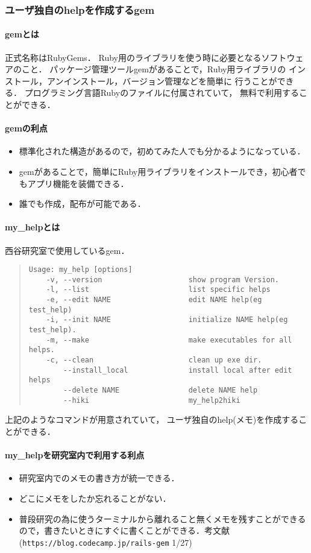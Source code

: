 \subsubsection{ユーザ独自のhelpを作成するgem}
\paragraph{gemとは}
正式名称はRubyGems．
Ruby用のライブラリを使う時に必要となるソフトウェアのこと．
パッケージ管理ツールgemがあることで，Ruby用ライブラリの
インストール，アンインストール，バージョン管理などを簡単に
行うことができる．
プログラミング言語Rubyのファイルに付属されていて，
無料で利用することができる．

\paragraph{gemの利点}
\begin{itemize}
\item 標準化された構造があるので，初めてみた人でも分かるようになっている．
\item gemがあることで，簡単にRuby用ライブラリをインストールでき，初心者でもアプリ機能を装備できる．
\item 誰でも作成，配布が可能である．
\end{itemize}
\paragraph{my\_helpとは}
西谷研究室で使用しているgem．
\begin{quote}\begin{verbatim}
Usage: my_help [options]
    -v, --version                    show program Version.
    -l, --list                       list specific helps
    -e, --edit NAME                  edit NAME help(eg test_help)
    -i, --init NAME                  initialize NAME help(eg test_help).
    -m, --make                       make executables for all helps.
    -c, --clean                      clean up exe dir.
        --install_local              install local after edit helps
        --delete NAME                delete NAME help
        --hiki                       my_help2hiki
\end{verbatim}\end{quote}
上記のようなコマンドが用意されていて，
ユーザ独自のhelp(メモ)を作成することができる．

\paragraph{my\_helpを研究室内で利用する利点}
\begin{itemize}
\item 研究室内でのメモの書き方が統一できる．
\item どこにメモをしたか忘れることがない．
\item 普段研究の為に使うターミナルから離れること無くメモを残すことができるので，書きたいときにすぐに書くことができる．考文献(\verb|https://blog.codecamp.jp/rails-gem| 1/27)
\end{itemize}
